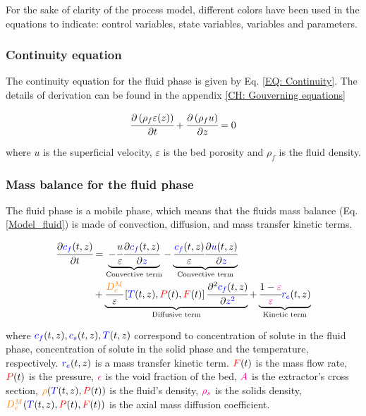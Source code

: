 \documentclass[../Parameter_fitting.tex]{subfiles}
\begin{document}
	For the sake of clarity of the process model, different colors have been used in the equations to indicate: 
	{\color{red}control variables},
	{\color{blue}state variables},
	{\color{orange}variables} and
	{\color{magenta}parameters}.
	
	\subsubsection{Continuity equation} \label{CH: Continuity}
	The continuity equation for the fluid phase is given by Eq. \ref{EQ: Continuity}. The details of derivation can be found in the appendix \ref{CH: Gouverning equations}
	
	{\footnotesize
		\begin{equation}
			\cfrac{\partial \left( \rho_f \varepsilon (z) \right)}{\partial t} + \cfrac{\partial \left( \rho_f u \right)}{\partial z} = 0
			\label{EQ: Continuity}
		\end{equation}
	}

	where $u$ is the superficial velocity, $\varepsilon$ is the bed porosity and $\rho_f$ is the fluid density. 
	
	\subsubsection{Mass balance for the fluid phase} \label{CH: Mass_balance_fluid}
	The fluid phase is a mobile phase, which means that the fluids mass balance (Eq. \ref{Model_fluid}) is made of convection, diffusion, and mass transfer kinetic terms.
	
	{\footnotesize
		\begin{align} 
			\label{Model_fluid}
			\cfrac{\partial {\color{blue}c_f}(t,z)}{\partial t} &	=  \underbrace{- \cfrac{u}{\varepsilon} \cfrac{\partial {\color{blue}c_f}(t,z)}{\partial {\color{blue}z}}}_{\text{Convective term}} - \underbrace{ \cfrac{ {\color{blue}c_f}(t,z) }{\varepsilon} \cfrac{\partial {\color{blue}u}(t,z)}{\partial {\color{blue}z}}}_{\text{Convective term}} \nonumber \\
			&+ \underbrace{ \cfrac{ {\color{orange}D^M_e} }{\varepsilon} \left[{\color{blue}T}(t,z),{\color{red}P}(t),{\color{red}F}(t)\right] \cfrac{\partial^2 {\color{blue}c_f}(t,z)}{\partial {\color{blue}z^2}} }_{\text{Diffusive term}} 
			+ \underbrace{ \cfrac{1-{\color{magenta}\varepsilon}}{{\color{magenta}\varepsilon}} {\color{blue}r_e}(t,z) }_{\text{Kinetic term}} 
	\end{align} }
	
	where ${\color{blue}c_f}(t,z), {\color{blue}c_s}(t,z), {\color{blue}T}(t,z)$ correspond to concentration of solute in the fluid phase, concentration of solute in the solid phase and the temperature, respectively. ${\color{blue}r_e}(t,z)$ is a mass transfer kinetic term. ${\color{red}F}(t)$ is the mass flow rate, ${\color{red}P}(t)$ is the pressure, ${\color{magenta}\epsilon}$ is the void fraction of the bed, ${\color{magenta}A}$ is the extractor’s cross section, ${\color{orange}\rho}({\color{blue}T}(t,z),{\color{red}P}(t))$ is the fluid's density, ${\color{magenta}\rho_s}$ is the solids density, ${\color{orange}D^M_e}({\color{blue}T}(t,z),{\color{red}P}(t),{\color{red}F}(t))$ is the axial mass diffusion coefficient.
	
\end{document}
